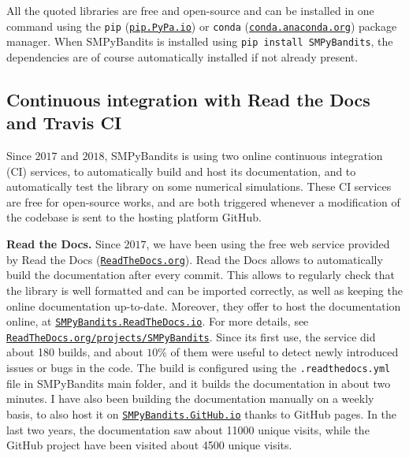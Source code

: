 All the quoted libraries are free and open-source and can be installed in one command using the \texttt{pip} (\texttt{\href{https://pip.pypa.io/}{pip.PyPa.io}}) or \texttt{conda} (\texttt{\href{http://conda.anaconda.org/}{conda.anaconda.org}}) package manager.
%
When SMPyBandits is installed using \texttt{pip install SMPyBandits}, the dependencies are of course automatically installed if not already present.


\subsection{Continuous integration with Read the Docs and Travis CI}

Since $2017$ and $2018$, SMPyBandits is using two online continuous integration (CI) services, to automatically build and host its documentation, and to automatically test the library on some numerical simulations.
%
These CI services are free for open-source works, and are both triggered whenever a modification of the codebase is sent to the hosting platform GitHub.

\textbf{Read the Docs.}
Since $2017$, we have been using the free web service provided by Read the Docs (\href{https://readthedocs.org/}{\texttt{ReadTheDocs.org}}).
Read the Docs allows to automatically build the documentation after every commit. This allows to regularly check that the library is well formatted and can be imported correctly, as well as keeping the online documentation up-to-date.
Moreover, they offer to host the documentation online, at \href{https://smpybandits.rtfd.io/}{\texttt{SMPyBandits.ReadTheDocs.io}}.
For more details, see \href{https://readthedocs.org/projects/smpybandits/}{\texttt{ReadTheDocs.org/projects/SMPyBandits}}.
%
Since its first use, the service did about 180 builds, and about $10\%$ of them were useful to detect newly introduced issues or bugs in the code.
The build is configured using the \texttt{.readthedocs.yml} file in SMPyBandits main folder, and it builds the documentation in about two minutes.
I have also been building the documentation manually on a weekly basis, to also host it on \href{https://smpybandits.github.io/}{\texttt{SMPyBandits.GitHub.io}} thanks to GitHub pages.
In the last two years, the documentation saw about 11000 unique visits, while the GitHub project have been visited about 4500 unique visits.


